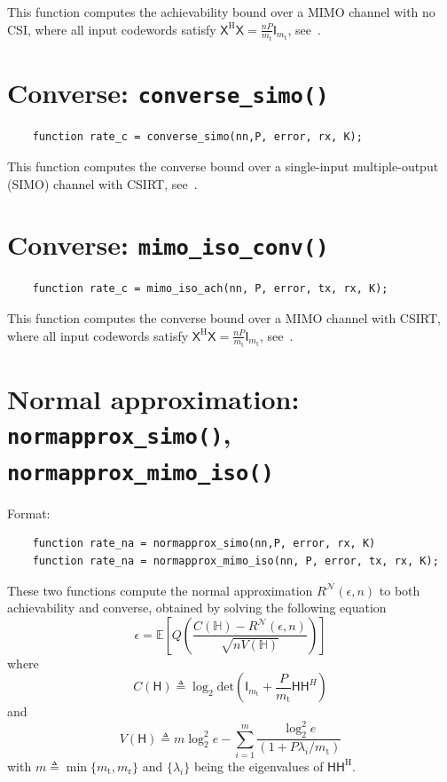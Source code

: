 \documentclass[a4paper,11p]{memoir}
\def\txant{m_{\mathrm{t}}} %
\def\rxant{m_{\mathrm{r}}} %
\def\bl{n} %
\begin{document}
This function computes the achievability bound over a MIMO channel with no CSI, where all input codewords satisfy $\mathsf{X}^{\mathrm{H}}\mathsf{X} = \frac{\bl P}{\txant}\mathsf{I}_{\txant}$, see~\cite[Eq.~(65)]{yang14-07a}. 

\section{Converse: \texttt{converse\_simo()}}
\begin{verbatim}
	function rate_c = converse_simo(nn,P, error, rx, K);
\end{verbatim}

This function computes the converse bound over a single-input multiple-output (SIMO) channel with CSIRT, see~\cite[Eq.~(76)]{yang14-07a}.

\section{Converse: \texttt{mimo\_iso\_conv()}}
\begin{verbatim}
	function rate_c = mimo_iso_ach(nn, P, error, tx, rx, K);
\end{verbatim}

This function computes the converse bound over a MIMO channel with CSIRT, where all input codewords satisfy $\mathsf{X}^{\mathrm{H}}\mathsf{X} = \frac{\bl P}{\txant}\mathsf{I}_{\txant}$, see~\cite[Eq.~(78)]{yang14-07a}. 



\section[Normal approximation]{Normal approximation: \texttt{normapprox\_simo()}, \texttt{normapprox\_mimo\_iso()}}

Format:
\begin{verbatim}
	function rate_na = normapprox_simo(nn,P, error, rx, K)
	function rate_na = normapprox_mimo_iso(nn, P, error, tx, rx, K);
\end{verbatim}

These two functions compute the normal approximation $R^{\mathcal{N}}(\epsilon,\bl)$ to both achievability and converse, obtained by solving the following equation
	$$ \epsilon  =\mathbb{E}\mathopen{}\left[Q\mathopen{}\left(\frac{C(\mathbb{H}) - R^{\mathcal{N}}(\epsilon,\bl) }{\sqrt{ n V(\mathbb{H}) }}\right)\right]$$
where
$$C(\mathsf{H}) \triangleq \log_2 \mathrm{det}\mathopen{} \left(\mathsf{I}_{\txant} + \frac{P}{\txant} \mathsf{H} \mathsf{H}^{H} \right)$$
and
$$V(\mathsf{H}) \triangleq  m\log_2^2 e  - \sum\limits_{i=1}^{m } \frac{\log_2^2 e}{(1+P\lambda_i/\txant)}$$
with $m \triangleq \min\{\txant , \rxant\}$ and $\{\lambda_i\}$ being the eigenvalues of $\mathsf{H}\mathsf{H}^{\mathrm{H}}$.
\end{document}
